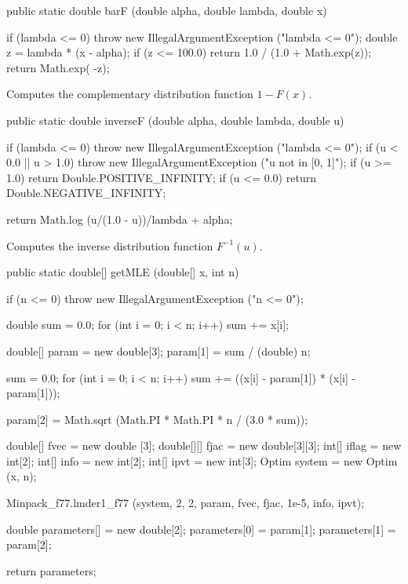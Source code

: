 \begin{code}

   public static double barF (double alpha, double lambda, double x)\begin{hide} {
      if (lambda <= 0)
        throw new IllegalArgumentException ("lambda <= 0");
      double z = lambda * (x - alpha);
      if (z <= 100.0)
         return 1.0 / (1.0 + Math.exp(z));
      return Math.exp( -z);
   }\end{hide}
\end{code}
  \begin{tabb}
  Computes  the complementary distribution function $1-F(x)$.
 \end{tabb}
\begin{code}

   public static double inverseF (double alpha, double lambda, double u)\begin{hide} {
        if (lambda <= 0)
           throw new IllegalArgumentException ("lambda <= 0");
        if (u < 0.0 || u > 1.0)
           throw new IllegalArgumentException ("u not in [0, 1]");
        if (u >= 1.0)
            return Double.POSITIVE_INFINITY;
        if (u <= 0.0)
            return Double.NEGATIVE_INFINITY;

        return Math.log (u/(1.0 - u))/lambda + alpha;
   }\end{hide}
\end{code}
  \begin{tabb}
  Computes the inverse distribution function $F^{-1}(u)$.
 \end{tabb}
\begin{code}

   public static double[] getMLE (double[] x, int n)\begin{hide} {
      if (n <= 0)
         throw new IllegalArgumentException ("n <= 0");

      double sum = 0.0;
      for (int i = 0; i < n; i++)
         sum += x[i];

      double[] param = new double[3];
      param[1] = sum / (double) n;

      sum = 0.0;
      for (int i = 0; i < n; i++)
         sum += ((x[i] - param[1]) * (x[i] - param[1]));

      param[2] = Math.sqrt (Math.PI * Math.PI * n / (3.0 * sum));

      double[] fvec = new double [3];
      double[][] fjac = new double[3][3];
      int[] iflag = new int[2];
      int[] info = new int[2];
      int[] ipvt = new int[3];
      Optim system = new Optim (x, n);

      Minpack_f77.lmder1_f77 (system, 2, 2, param, fvec, fjac, 1e-5, info, ipvt);

      double parameters[] = new double[2];
      parameters[0] = param[1];
      parameters[1] = param[2];

      return parameters;
   }\end{hide}
\end{code}
